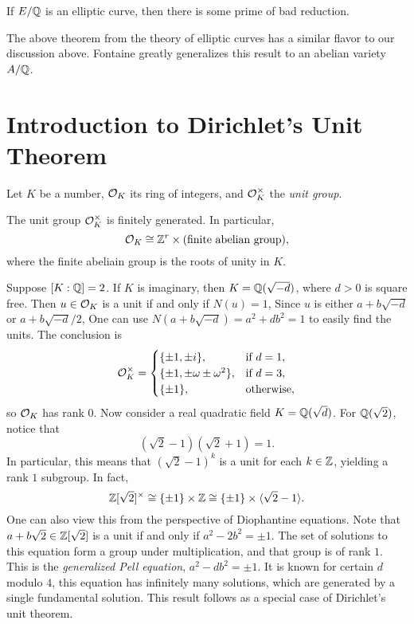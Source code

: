 \begin{theorem}[Tate?]
  If $E / \mathbb{Q}$ is an elliptic curve, then there is some
  prime of bad reduction.
\end{theorem}

\begin{remark}
  The above theorem from the theory of elliptic curves
  has a similar flavor to our
  discussion above. Fontaine greatly generalizes this result to
  an abelian variety $A / \mathbb{Q}$.
\end{remark}

\section{Introduction to Dirichlet's Unit Theorem}

\begin{remark}
  Let $K$ be a number, $\mathcal{O}_K$ its ring of integers, and
  $\mathcal{O}_K^\times$ the \emph{unit group}.
\end{remark}

\begin{theorem}
  The unit group $\mathcal{O}_K^\times$ is finitely generated. In
  particular,
  \[
    \mathcal{O}_K \cong \mathbb{Z}^r \times (\text{finite abelian group}),
  \]
  where the finite abeliain group is the roots of unity in $K$.
\end{theorem}

\begin{example}
  Suppose $[K : \mathbb{Q}] = 2$. If $K$ is imaginary, then
  $K = \mathbb{Q}(\sqrt{-d})$, where $d > 0$ is square free. Then
  $u \in \mathcal{O}_K$ is a unit if and only if $N(u) = 1$,
  Since $u$ is either $a + b \sqrt{-d}$ or $a + b \sqrt{-d} / 2$,
  One can use $N(a + b\sqrt{-d}) = a^2 + db^2 = 1$ to
  easily find the units. The conclusion is
  \[
    \mathcal{O}_K^\times =
    \begin{cases}
      \{\pm 1, \pm i\}, & \text{if } d = 1, \\
      \{\pm 1, \pm \omega \pm \omega^2\}, & \text{if } d = 3, \\
      \{\pm 1\}, & \text{otherwise},
    \end{cases}
  \]
  so $\mathcal{O}_K$ has rank $0$. Now consider a real
  quadratic field $K = \mathbb{Q}(\sqrt{d})$.
  For $\mathbb{Q}(\sqrt{2})$, notice that
  \[
    (\sqrt{2} - 1) (\sqrt{2} + 1) = 1.
  \]
  In particular, this means that $(\sqrt{2} - 1)^k$ is a
  unit for each $k \in \mathbb{Z}$, yielding a rank $1$ subgroup.
  In fact,
  \[
    \mathbb{Z}[\sqrt{2}]^\times
    \cong \{\pm 1\} \times \mathbb{Z}
    \cong \{\pm 1\} \times \langle \sqrt{2} - 1 \rangle.
  \]
  One can also view this from the perspective of Diophantine
  equations. Note that $a + b\sqrt{2} \in \mathbb{Z}[\sqrt{2}]$
  is a unit if and only if $a^2 - 2b^2 = \pm 1$. The
  set of solutions to this equation form a group under
  multiplication, and that group is of rank $1$.
  This is the \emph{generalized Pell equation},
  $a^2 - db^2 = \pm 1$. It is known for certain $d$ modulo
  $4$, this equation has
  infinitely many solutions, which are generated by a single
  fundamental solution. This result follows as a special case
  of Dirichlet's unit theorem.
\end{example}

